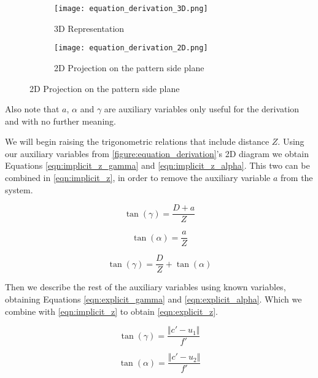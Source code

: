 \documentclass[
a4paper,
12pt,
]{article}
\begin{document}
\begin{figure}
\centering
\caption{Distance measurement diagram}
\label{figure:equation_derivation}
	\begin{subfigure}[b]{0.45\textwidth}
	\label{figure:equation_derivation_3D}
	\texttt{[image: equation\_derivation\_3D.png]}
	\caption{3D Representation}
	\end{subfigure}
	\begin{subfigure}[b]{0.45\textwidth}
	\label{figure:equation_derivation_2D}
	\texttt{[image: equation\_derivation\_2D.png]}
	\caption{2D Projection on the pattern side plane}
	\end{subfigure}
\end{figure}

Also note that $a$, $\alpha$ and $\gamma$ are auxiliary variables only useful for the derivation and with no further meaning.

We will begin raising the trigonometric relations that include distance $Z$. Using our auxiliary variables from \autoref{figure:equation_derivation}'s 2D diagram we obtain Equations \ref{eqn:implicit_z_gamma} and \ref{eqn:implicit_z_alpha}. This two can be combined in \autoref{eqn:implicit_z}, in order to remove the auxiliary variable $a$ from the system.

\begin{minipage}{0.4\textwidth}
\begin{equation}
\label{eqn:implicit_z_gamma}
\tan(\gamma)=\frac{D+a}{Z}
\end{equation}
\end{minipage}
\begin{minipage}{0.4\textwidth}
\begin{equation}
\label{eqn:implicit_z_alpha}
\tan(\alpha)=\frac{a}{Z}
\end{equation}
\end{minipage}

\begin{equation}
\label{eqn:implicit_z}
\tan(\gamma)=\frac{D}{Z}+\tan(\alpha)
\end{equation}

Then we describe the rest of the auxiliary variables using  known variables, obtaining Equations \ref{eqn:explicit_gamma} and \ref{eqn:explicit_alpha}. Which we combine with \autoref{eqn:implicit_z} to obtain \autoref{eqn:explicit_z}.

\begin{minipage}{0.4\textwidth}
\begin{equation}
\label{eqn:explicit_gamma}
\tan(\gamma)=\frac{\Vert c'-u_{1} \Vert}{f'}
\end{equation}
\end{minipage}
\begin{minipage}{0.4\textwidth}
\begin{equation}
\label{eqn:explicit_alpha}
\tan(\alpha)=\frac{\Vert c'-u_{2} \Vert}{f'}
\end{equation}
\end{minipage}
\end{document}
